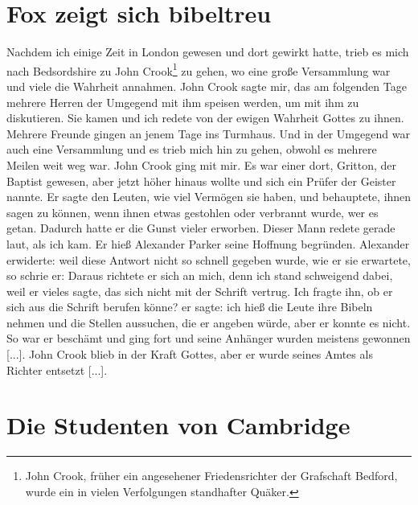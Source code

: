\section{Fox zeigt sich bibeltreu}

Nachdem ich einige Zeit in London gewesen und dort gewirkt
hatte, trieb es mich nach Bedsordshire zu John 
Crook\footnote{John Crook, früher ein angesehener Friedensrichter 
der Grafschaft Bedford, wurde ein in vielen Verfolgungen 
standhafter Quäker.} zu gehen,
wo eine große Versammlung war und viele die Wahrheit annahmen.
John Crook sagte mir, das am folgenden Tage mehrere Herren
der Umgegend mit ihm speisen werden, um mit ihm zu diskutieren.
Sie kamen und ich redete von der ewigen Wahrheit Gottes zu
ihnen. Mehrere Freunde gingen an jenem Tage ins Turmhaus.
Und in der Umgegend war auch eine Versammlung und es trieb
mich hin zu gehen, obwohl es mehrere Meilen weit weg war.
John Crook ging mit mir. Es war einer dort, 
Gritton, der Baptist gewesen, 
aber jetzt höher hinaus wollte und sich ein Prüfer
der Geister nannte. Er sagte den Leuten, wie viel Vermögen
sie haben, und behauptete, ihnen sagen zu können, wenn ihnen
etwas gestohlen oder verbrannt wurde, wer es getan.
Dadurch hatte er die Gunst vieler erworben. Dieser Mann redete gerade
laut, als ich kam. Er hieß Alexander Parker 
seine Hoffnung
begründen. Alexander erwiderte: 
weil diese Antwort nicht so schnell gegeben wurde, wie er sie
erwartete, so schrie er:  Daraus richtete
er sich an mich, denn ich stand schweigend dabei, weil er vieles
sagte, das sich nicht mit der Schrift vertrug. 
Ich fragte ihn,
ob er sich aus die Schrift berufen könne? er sagte:  ich hieß
die Leute ihre Bibeln nehmen und die Stellen aussuchen, die
er angeben würde, aber er konnte es nicht. So war er beschämt
und ging fort und seine Anhänger wurden meistens gewonnen [...].
John Crook blieb in der Kraft Gottes, aber 
er wurde seines Amtes als Richter entsetzt [...].

\section{Die Studenten von Cambridge}

